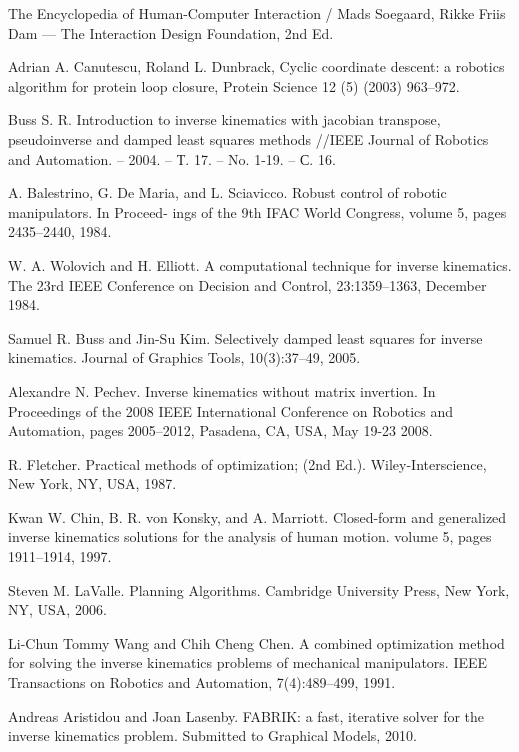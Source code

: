     \begin{thebibliography}{99}
    	 The Encyclopedia of Human-Computer Interaction / Mads Soegaard, Rikke Friis Dam --- The Interaction Design Foundation, 2nd Ed.
    	
    	 Adrian A. Canutescu, Roland L. Dunbrack, Cyclic coordinate descent: a robotics algorithm for protein loop closure, Protein Science 12 (5) (2003) 963–972.
    	
    	 Buss S. R. Introduction to inverse kinematics with jacobian transpose, pseudoinverse and damped least squares methods //IEEE Journal of Robotics and Automation. – 2004. – Т. 17. – No. 1-19. – С. 16.
    	
    	 A. Balestrino, G. De Maria, and L. Sciavicco. Robust control of robotic manipulators. In Proceed-
    	ings of the 9th IFAC World Congress, volume 5, pages 2435–2440, 1984.
    	
    	 W. A. Wolovich and H. Elliott. A computational technique for inverse kinematics. The 23rd IEEE
    	Conference on Decision and Control, 23:1359–1363, December 1984.
    	
    	 Samuel R. Buss and Jin-Su Kim. Selectively damped least squares for inverse kinematics. Journal of Graphics Tools, 10(3):37–49, 2005.
    	
    	 Alexandre N. Pechev. Inverse kinematics without matrix invertion. In Proceedings of the 2008 IEEE International Conference on Robotics and Automation, pages 2005–2012, Pasadena, CA, USA, May 19-23 2008.
    	
    	
    	 R. Fletcher. Practical methods of optimization; (2nd Ed.). Wiley-Interscience, New York, NY, USA, 1987.
    	
    	 Kwan W. Chin, B. R. von Konsky, and A. Marriott. Closed-form and generalized inverse kinematics solutions for the analysis of human motion. volume 5, pages 1911–1914, 1997.
    	
    	 Steven M. LaValle. Planning Algorithms. Cambridge University Press, New York, NY, USA, 2006.
    	
    	 Li-Chun Tommy Wang and Chih Cheng Chen. A combined optimization method for solving the inverse kinematics problems of mechanical manipulators. IEEE Transactions on Robotics and Automation, 7(4):489–499, 1991.
    	
    	 Andreas Aristidou and Joan Lasenby. FABRIK: a fast, iterative solver for the inverse kinematics
    	problem. Submitted to Graphical Models, 2010.
    	
    \end{thebibliography} 
